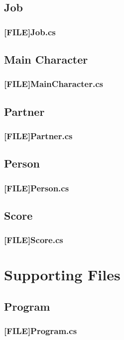 \subsection{Job}
\subsubsection{[FILE]Job.cs}


\subsection{Main Character}
\subsubsection{[FILE]MainCharacter.cs}


\subsection{Partner}
\subsubsection{[FILE]Partner.cs}


\subsection{Person}
\subsubsection{[FILE]Person.cs}


\subsection{Score}
\subsubsection{[FILE]Score.cs}



\section{Supporting Files}

\subsection{Program}
\subsubsection{[FILE]Program.cs}

